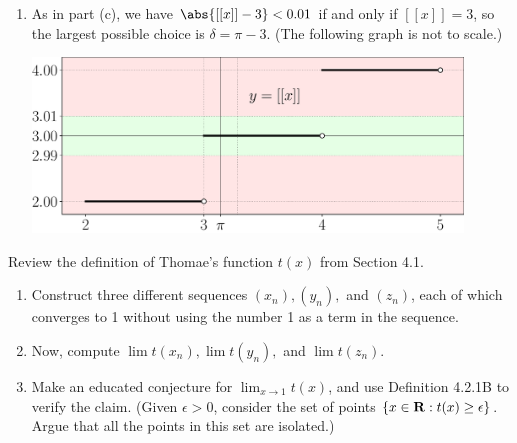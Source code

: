 \documentclass{lew98_solutions}
\begin{document}
\begin{solution}
\begin{enumerate}
        \item As in part (c), we have \( \abs{[[x]] - 3} < 0.01 \) if and only if \( [[x]] = 3 \), so the largest possible choice is \( \delta = \pi - 3 \). (The following graph is not to scale.)
        \begin{center}
            \includegraphics[width=0.9\textwidth]{UA_Figures/UA_ex4_2_2_fig_3.pdf}
        \end{center}
    \end{enumerate}
\end{solution}

\begin{exercise}
\label{ex:4.2.3}
    Review the definition of Thomae's function \( t(x) \) from Section 4.1.
    \begin{enumerate}
        \item Construct three different sequences \( (x_n), (y_n), \) and \( (z_n) \), each of which converges to 1 without using the number 1 as a term in the sequence.

        \item Now, compute \( \lim t(x_n), \lim t(y_n), \) and \( \lim t(z_n) \).

        \item Make an educated conjecture for \( \lim_{x \to 1} t(x) \), and use Definition 4.2.1B to verify the claim. (Given \( \epsilon > 0 \), consider the set of points \( \{ x \in \mathbf{R} : t(x) \geq \epsilon \} \). Argue that all the points in this set are isolated.)
    \end{enumerate}
\end{exercise}
\end{document}
